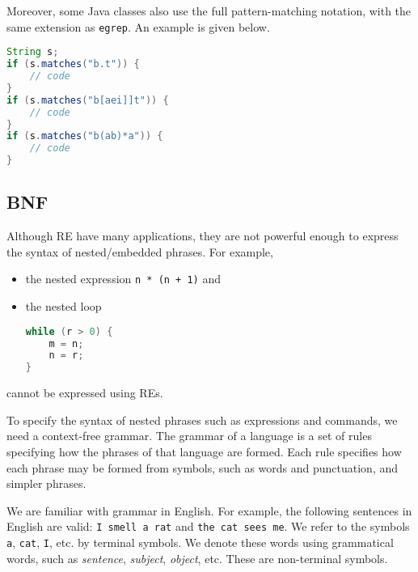 \documentclass[a4paper, openany]{memoir}
\begin{document}
Moreover, some Java classes also use the full pattern-matching notation, with the same extension as \texttt{egrep}. An example is given below.
\begin{lstlisting}[language=java]
String s;
if (s.matches("b.t")) {
    // code
}
if (s.matches("b[aei]]t")) {
    // code
}
if (s.matches("b(ab)*a")) {
    // code
}
\end{lstlisting}

\subsection{BNF}
Although RE have many applications, they are not powerful enough to express the syntax of nested/embedded phrases. For example,
\begin{itemize}
    \item the nested expression \texttt{n * (n + 1)} and
    \item the nested loop 
\begin{lstlisting}[language=java]
while (r > 0) {
    m = n;
    n = r;
}
\end{lstlisting}
\end{itemize}
cannot be expressed using REs. 

To specify the syntax of nested phrases such as expressions and commands, we need a context-free grammar. The grammar of a language is a set of rules specifying how the phrases of that language are formed. Each rule specifies how each phrase may be formed from symbols, such as words and punctuation, and simpler phrases.

We are familiar with grammar in English. For example, the following sentences in English are valid: \texttt{I smell a rat} and \texttt{the cat sees me}. We refer to the symbols \texttt{a}, \texttt{cat}, \texttt{I}, etc. by terminal symbols. We denote these words using grammatical words, such as \textit{sentence}, \textit{subject}, \textit{object}, etc. These are non-terminal symbols.
\end{document}
